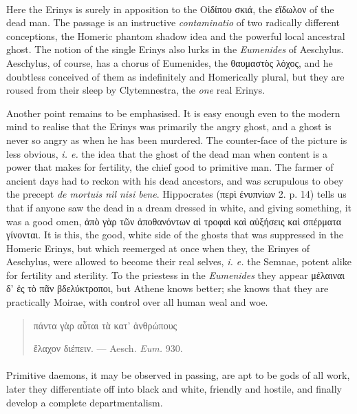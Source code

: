 \documentclass[a4paper, 11pt, oneside, polutonikogreek, english]{article}
\begin{document}
\paragraph{}
Here the Erinys is surely in apposition to the Οἰδίπου σκιά, the εἴδωλον of the dead man. The passage is an instructive \emph{contaminatio} of two radically different conceptions, the Homeric phantom shadow idea and the powerful local ancestral ghost. The notion of the single Erinys also lurks in the \emph{Eumenides} of Aeschylus. Aeschylus, of course, has a chorus of Eumenides, the θαυμαστὸς λόχος, and he doubtless conceived of them as indefinitely and Homerically plural, but they are roused from their sleep by Clytemnestra, the \emph{one} real Erinys.

Another point remains to be emphasised. It is easy enough even to the modern mind to realise that the Erinys was primarily the angry ghost, and a ghost is never so angry as when he has been murdered. The counter-face of the picture is less obvious, \emph{i. e.} the idea that the ghost of the dead man when content is a power that makes for fertility, the chief good to primitive man. The farmer of ancient days had to reckon with his dead ancestors, and was scrupulous to obey the precept \emph{de mortuis nil nisi bene}. Hippocrates (περὶ ἐνυπνίων 2. p. 14) tells us that if anyone saw the dead in a dream dressed in white, and giving something, it was a good omen, ἀπὸ γὰρ τῶν ἀποθανόντων αἱ τροφαὶ καὶ αὐξήσεις καὶ σπέρματα γίνονται. It is this, the good, white side of the ghosts that was suppressed in the Homeric Erinys, but which reemerged at once when they, the Erinyes of Aeschylus, were allowed to become their real selves, \emph{i. e.} the Semnae, potent alike for fertility and sterility. To the priestess in the \emph{Eumenides} they appear μέλαιναι δ' ἐς τὸ πᾶν βδελύκτροποι, but Athene knows better; she knows that they are practically Moirae, with control over all human weal and woe.
\begin{quotation}
\large
πάντα γὰρ αὗται τὰ κατ' ἀνθρώπους

ἔλαχον διέπειν. --- Aesch. \emph{Eum.} 930.
\end{quotation}
\paragraph{}
Primitive daemons, it may be observed in passing, are apt to be gods of all work, later they differentiate off into black and white, friendly and hostile, and finally develop a complete departmentalism.
\end{document}
